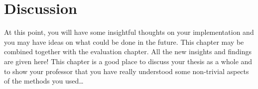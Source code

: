 \chapter{Discussion}
\label{chapter:discussion}

At this point, you will have some insightful thoughts on your
implementation and you may have ideas on what could be done in the
future. This chapter may be combined together with the evaluation
chapter. All the new insights and findings are given here!  This
chapter is a good place to discuss your thesis as a whole and to show
your professor that you have really understood some non-trivial
aspects of the methods you used\ldots

